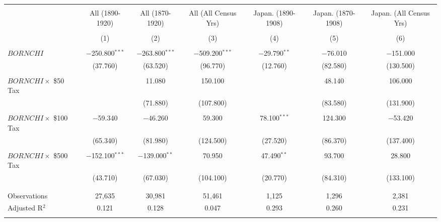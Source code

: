 
\begin{tabular}{@{\extracolsep{5pt}}lcccccc} 
\\[-1.8ex]\hline 
\hline \\[-1.8ex] 
 & All (1890-1920) & All (1870-1920) & All (All Census Yrs) & Japan. (1890-1908) & Japan. (1870-1908) & Japan. (All Census Yrs) \\ 
\\[-1.8ex] & (1) & (2) & (3) & (4) & (5) & (6)\\ 
\hline \\[-1.8ex] 
 $BORNCHI$ & $-$250.800$^{***}$ & $-$263.800$^{***}$ & $-$509.200$^{***}$ & $-$29.790$^{**}$ & $-$76.010 & $-$151.000 \\ 
  & (37.760) & (63.520) & (96.770) & (12.760) & (82.580) & (130.500) \\ 
  & & & & & & \\ 
 $BORNCHI \times$ \$50 Tax &  & 11.080 & 150.100 &  & 48.140 & 106.000 \\ 
  &  & (71.880) & (107.800) &  & (83.580) & (131.900) \\ 
  & & & & & & \\ 
 $BORNCHI \times$ \$100 Tax & $-$59.340 & $-$46.260 & 59.300 & 78.100$^{***}$ & 124.300 & $-$53.420 \\ 
  & (65.340) & (81.980) & (124.500) & (27.520) & (86.370) & (137.400) \\ 
  & & & & & & \\ 
 $BORNCHI \times$ \$500 Tax & $-$152.100$^{***}$ & $-$139.000$^{**}$ & 70.950 & 47.490$^{**}$ & 93.700 & 28.800 \\ 
  & (43.710) & (67.030) & (104.100) & (20.770) & (84.310) & (133.100) \\ 
  & & & & & & \\ 
\hline \\[-1.8ex] 
Observations & 27,635 & 30,981 & 51,461 & 1,125 & 1,296 & 2,381 \\ 
Adjusted R$^{2}$ & 0.121 & 0.128 & 0.047 & 0.293 & 0.260 & 0.231 \\ 
\hline \\[-1.8ex] 
\end{tabular} 

